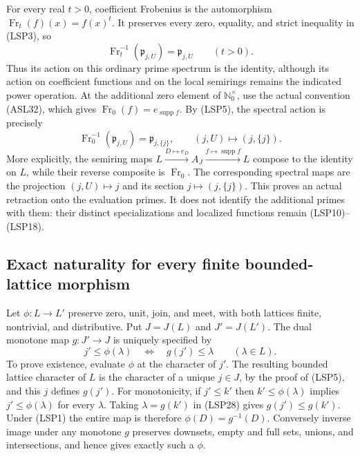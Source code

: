 For every real $t>0$, coefficient Frobenius is the automorphism
$\operatorname{Fr}_t(f)(x)=f(x)^t$. It preserves every zero,
equality, and strict inequality in (LSP3), so
\begin{equation}\tag{LSP26}
 \operatorname{Fr}_t^{-1}(\mathfrak p_{j,U})
       =\mathfrak p_{j,U}\qquad(t>0).
\end{equation}
Thus its action on this ordinary prime spectrum is the identity,
although its action on coefficient functions and on the local
semirings remains the indicated power operation. At the additional
zero element of $\mathbb N_0^\times$, use the actual convention
(ASL32), which gives $\operatorname{Fr}_0(f)=e_{\operatorname{supp}f}$.
By (LSP5), the spectral action is precisely
\begin{equation}\tag{LSP27}
 \operatorname{Fr}_0^{-1}(\mathfrak p_{j,U})
      =\mathfrak p_{j,\{j\}},\qquad
 (j,U)\longmapsto(j,\{j\}).
\end{equation}
More explicitly, the semiring maps
$L\xrightarrow{D\mapsto e_D} A_J
\xrightarrow{f\mapsto\operatorname{supp}f} L$
compose to the identity on $L$, while their reverse composite is
$\operatorname{Fr}_0$. The corresponding spectral maps are the
projection $(j,U)\mapsto j$ and its section $j\mapsto(j,\{j\})$.
This proves an actual retraction onto the evaluation primes. It
does not identify the additional primes with them: their distinct
specializations and localized functions remain (LSP10)--(LSP18).

\subsection{Exact naturality for every finite bounded-lattice morphism}

Let $\phi:L\to L'$ preserve zero, unit, join, and meet, with both
lattices finite, nontrivial, and distributive. Put $J=J(L)$ and
$J'=J(L')$. The dual monotone map $g:J'\to J$ is uniquely specified
by
\begin{equation}\tag{LSP28}
 j'\le\phi(\lambda)\quad\Longleftrightarrow\quad
 g(j')\le\lambda\qquad(\lambda\in L).
\end{equation}
To prove existence, evaluate $\phi$ at the character of $j'$.
The resulting bounded lattice character of $L$ is the character
of a unique $j\in J$, by the proof of (LSP5), and this $j$ defines
$g(j')$. For monotonicity, if $j'\le k'$ then
$k'\le\phi(\lambda)$ implies $j'\le\phi(\lambda)$ for every
$\lambda$. Taking $\lambda=g(k')$ in (LSP28) gives
$g(j')\le g(k')$. Under (LSP1) the entire map is therefore
$\phi(D)=g^{-1}(D)$. Conversely inverse image under any monotone
$g$ preserves downsets, empty and full sets, unions, and
intersections, and hence gives exactly such a $\phi$.

